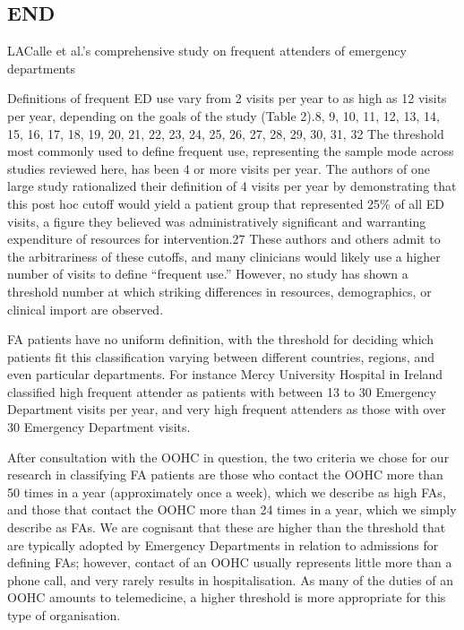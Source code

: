 


\subsection{END}



LACalle et al.'s comprehensive study on frequent attenders of emergency departments  


Definitions of frequent ED use vary from 2 visits per year to as high as 12 visits per year, depending on the goals of the study (Table 2).8, 9, 10, 11, 12, 13, 14, 15, 16, 17, 18, 19, 20, 21, 22, 23, 24, 25, 26, 27, 28, 29, 30, 31, 32 The threshold most commonly used to define frequent use, representing the sample mode across studies reviewed here, has been 4 or more visits per year. The authors of one large study rationalized their definition of 4 visits per year by demonstrating that this post hoc cutoff would yield a patient group that represented 25\% of all ED visits, a figure they believed was administratively significant and warranting expenditure of resources for intervention.27 These authors and others admit to the arbitrariness of these cutoffs, and many clinicians would likely use a higher number of visits to define “frequent use.” However, no study has shown a threshold number at which striking differences in resources, demographics, or clinical import are observed.

FA patients have no uniform definition, with the threshold for deciding which patients fit this classification varying between different countries, regions, and even particular departments. For instance Mercy University Hospital in Ireland classified high frequent attender as patients with between 13 to 30 Emergency Department visits per year, and very high frequent attenders as those with over 30 Emergency Department visits.\cite{bhroin2019profiling}

After consultation with the OOHC in question, the two criteria we chose for our research in classifying FA patients are those who contact the OOHC more than 50 times in a year (approximately once a week), which we describe as high FAs, and those that contact the OOHC more than 24 times in a year, which we simply describe as FAs. We are cognisant that these are higher than the threshold that are typically adopted by Emergency Departments in relation to admissions for defining FAs; however, contact of an OOHC usually represents little more than a phone call, and very rarely results in hospitalisation. As many of the duties of an OOHC amounts to telemedicine, a higher threshold is more appropriate for this type of organisation.

